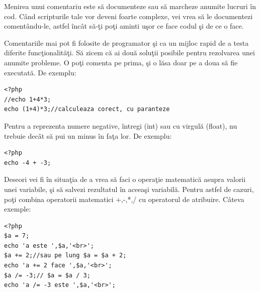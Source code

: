 Menirea unui comentariu este să documenteze sau să marcheze
anumite lucruri în cod. Când scripturile tale vor deveni foarte complexe,
vei vrea să le documentezi comentându-le, astfel încât să-ţi
poţi aminti uşor ce face codul şi de ce o face.


Comentariile mai pot fi folosite de programator
şi ca un mijloc rapid de a testa diferite funcţionalităţi.
Să zicem că ai două soluţii posibile pentru rezolvarea
unei anumite probleme. O poţi comenta pe prima, şi
o lăsa doar pe a doua să fie executată. De exemplu:

\begin{lstlisting}
<?php
//echo 1+4*3;
echo (1+4)*3;//calculeaza corect, cu paranteze
\end{lstlisting}

Pentru a reprezenta numere negative, întregi (int)
sau cu virgulă (float), nu trebuie decât să pui un
minus în faţa lor. De exemplu:

\begin{lstlisting}
<?php
echo -4 + -3;
\end{lstlisting}

Deseori vei fi în situaţia de a vrea
să faci o operaţie matematică
asupra valorii unei variabile,
şi să salvezi rezultatul în aceeaşi variabilă.
Pentru astfel de cazuri, poţi combina operatorii
matematici +,-,*,/ cu operatorul de atribuire. Câteva
exemple:
\begin{lstlisting}
<?php
$a = 7;
echo 'a este ',$a,'<br>';
$a += 2;//sau pe lung $a = $a + 2;
echo 'a += 2 face ',$a,'<br>';
$a /= -3;// $a = $a / 3;
echo 'a /= -3 este ',$a,'<br>';
\end{lstlisting}

